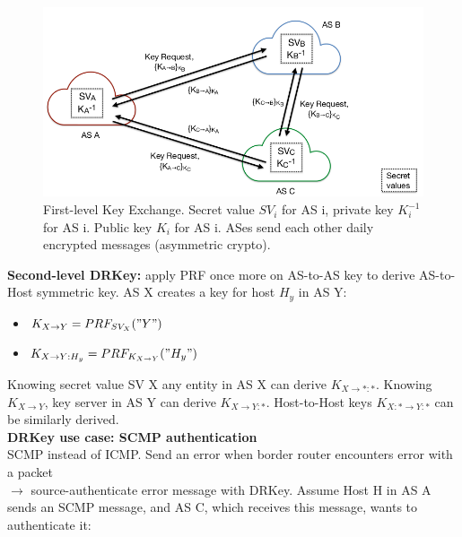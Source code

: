 \documentclass[11pt,oneside,a4paper]{article}
\begin{document}
\newpage

\begin{figure}
	\centering
	\includegraphics[width=0.7\linewidth]{figures/drkey_firstlevel_key_exchange}
	\caption{First-level Key Exchange. Secret value $SV_i$ for AS i, private key $K_i^{-1}$ for AS i. Public key $K_i$ for AS i. ASes send each other daily encrypted messages (asymmetric crypto).}
	\label{fig:drkeyfirstlevelkeyexchange}
\end{figure}

\noindent \textbf{Second-level DRKey:} apply PRF once more on AS-to-AS key to derive AS-to-Host symmetric key. AS X creates a key for host $H_y$ in AS Y:

\vspace{-\topsep}
\begin{itemize}
	\setlength{\itemsep}{0pt}
	\setlength{\parskip}{0pt}
	\item $K_{X\rightarrow Y} = PRF_{SV_X}("Y")$
	\item $K_{X\rightarrow Y:H_y} = PRF_{K_{X\rightarrow Y}}("H_y")$
\end{itemize}
\vspace{-\topsep}

\noindent Knowing secret value SV X any entity in AS X can derive $K_{X\rightarrow *:*}$. Knowing $K_{X\rightarrow Y}$, key server in AS Y can derive $K_{X\rightarrow Y:*}$. Host-to-Host keys $K_{X:*\rightarrow Y:*}$ can be similarly derived.\\

\noindent \textbf{DRKey use case: SCMP authentication}\\

\noindent SCMP instead of ICMP. Send an error when border router encounters error with a packet\\ $\rightarrow$ source-authenticate error message with DRKey. Assume Host H in AS A sends an SCMP message, and AS C, which receives this message, wants to authenticate it:
\end{document}
